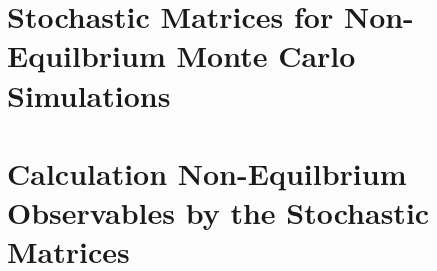 \section{Stochastic Matrices for Non-Equilbrium Monte Carlo Simulations}

\section{Calculation Non-Equilbrium Observables by the Stochastic Matrices}